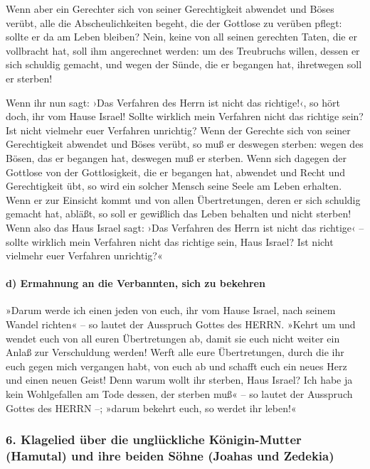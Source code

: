 Wenn aber ein Gerechter sich von seiner Gerechtigkeit
abwendet und Böses verübt, alle die Abscheulichkeiten begeht, die der
Gottlose zu verüben pflegt: sollte er da am Leben bleiben? Nein, keine
von all seinen gerechten Taten, die er vollbracht hat, soll ihm
angerechnet werden: um des Treubruchs willen, dessen er sich schuldig
gemacht, und wegen der Sünde, die er begangen hat, ihretwegen soll er
sterben!

Wenn ihr nun sagt: ›Das Verfahren des Herrn ist nicht das
richtige!‹, so hört doch, ihr vom Hause Israel! Sollte wirklich mein
Verfahren nicht das richtige sein? Ist nicht vielmehr euer Verfahren
unrichtig? Wenn der Gerechte sich von seiner
Gerechtigkeit abwendet und Böses verübt, so muß er deswegen sterben:
wegen des Bösen, das er begangen hat, deswegen muß er sterben.
Wenn sich dagegen der Gottlose von der Gottlosigkeit, die
er begangen hat, abwendet und Recht und Gerechtigkeit übt, so wird ein
solcher Mensch seine Seele am Leben erhalten. Wenn er zur
Einsicht kommt und von allen Übertretungen, deren er sich schuldig
gemacht hat, abläßt, so soll er gewißlich das Leben behalten und nicht
sterben! Wenn also das Haus Israel sagt: ›Das Verfahren
des Herrn ist nicht das richtige‹ -- sollte wirklich mein Verfahren
nicht das richtige sein, Haus Israel? Ist nicht vielmehr euer Verfahren
unrichtig?«

\hypertarget{d-ermahnung-an-die-verbannten-sich-zu-bekehren}{%
\paragraph{d) Ermahnung an die Verbannten, sich zu
bekehren}\label{d-ermahnung-an-die-verbannten-sich-zu-bekehren}}

»Darum werde ich einen jeden von euch, ihr vom Hause
Israel, nach seinem Wandel richten« -- so lautet der Ausspruch Gottes
des HERRN. »Kehrt um und wendet euch von all euren Übertretungen ab,
damit sie euch nicht weiter ein Anlaß zur Verschuldung werden!
Werft alle eure Übertretungen, durch die ihr euch gegen
mich vergangen habt, von euch ab und schafft euch ein neues Herz und
einen neuen Geist! Denn warum wollt ihr sterben, Haus Israel?
Ich habe ja kein Wohlgefallen am Tode dessen, der sterben
muß« -- so lautet der Ausspruch Gottes des HERRN --; »darum bekehrt
euch, so werdet ihr leben!«

\hypertarget{klagelied-uxfcber-die-ungluxfcckliche-kuxf6nigin-mutter-hamutal-und-ihre-beiden-suxf6hne-joahas-und-zedekia}{%
\subsubsection{6. Klagelied über die unglückliche Königin-Mutter
(Hamutal) und ihre beiden Söhne (Joahas und
Zedekia)}\label{klagelied-uxfcber-die-ungluxfcckliche-kuxf6nigin-mutter-hamutal-und-ihre-beiden-suxf6hne-joahas-und-zedekia}}

